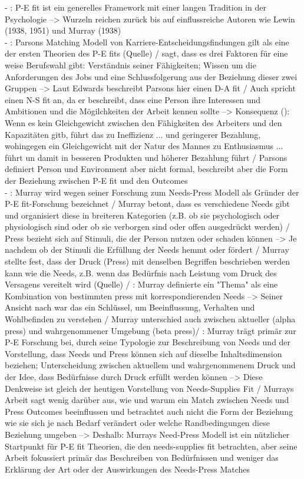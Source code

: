 - \cite[S. 1]{edwards:1990}: P-E fit ist ein generelles Framework mit einer langen Tradition in der Psychologie --> Wurzeln reichen zurück bis auf einflussreiche Autoren wie Lewin (1938, 1951) und Murray (1938) \\
- \cite[S. 6f.]{edwards:2008}: Parsons Matching Modell von Karriere-Entscheidungsfindungen gilt als eine der ersten Theorien des P-E fits (Quelle) / \textcite[S. 5]{parsons:1909} sagt, dass es drei Faktoren für eine weise Berufswahl gibt: Verständnis seiner Fähigkeiten; Wissen um die Anforderungen des Jobs und eine Schlussfolgerung aus der Beziehung dieser zwei Gruppen --> Laut Edwards beschreibt Parsons hier einen D-A fit / Auch spricht \textcite{parsons:1909} einen N-S fit an, da er beschreibt, dass eine Person ihre Interessen und Ambitionen und die Mögilchkeiten der Arbeit kennen sollte --> Konsequenz (\cite[S. 3]{parsons:1909}): Wenn es kein Gleichgewicht zwischen den Fähigkeiten des Arbeiters und den Kapazitäten gitb, führt das zu Ineffizienz ... und geringerer Bezahlung, wohingegen ein Gleichgewicht mit der Natur des Mannes zu Enthusiasmus ... führt un damit in besseren Produkten und höherer Bezahlung führt / Parsons definiert Person und Environment aber nicht formal, beschreibt aber die Form der Beziehung zwischen P-E fit und den Outcomes \\
- \cite[S. 7]{edwards:2008}: Murray wird wegen seiner Forschung zum Needs-Press Modell als Gründer der P-E fit-Forschung bezeichnet / Murray betont, dass es verschiedene Needs gibt und organisiert diese in breiteren Kategorien (z.B. ob sie psychologisch oder physiologisch sind oder ob sie verborgen sind oder offen ausgedrückt werden) / Press bezieht sich auf Stimuli, die der Person nutzen oder schaden können --> Je nachdem ob der Stimuli die Erfüllung der Needs hemmt oder fördert / Murray stellte fest, dass der Druck (Press) mit denselben Begriffen beschrieben werden kann wie die Needs, z.B. wenn das Bedürfnis nach Leistung vom Druck des Versagens vereitelt wird (Quelle) / \cite[S. 7f.]{edwards:2008}: Murray definierte ein "Thema" als eine Kombination von bestimmten press mit korrespondierenden Needs --> Seiner Ansicht nach war das ein Schlüssel, um Beeinflussung, Verhalten und Wohlbefinden zu verstehen / Murray unterschied auch zwischen aktueller (alpha press) und wahrgenommener Umgebung (beta press)/ \cite[S. 8]{edwards:2008}: Murray trägt primär zur P-E Forschung bei, durch seine Typologie zur Beschreibung von Needs und der Vorstellung, dass Needs und Press können sich auf dieselbe Inhaltsdimension beziehen; Unterscheidung zwischen aktuellem und wahrgenommenem Druck und der Idee, dass Bedürfnisse durch Druck erfüllt werden können --> Diese Denkweise ist gleich der heutigen Vorstellung von Needs-Supplies Fit / Murrays Arbeit sagt wenig darüber aus, wie und warum ein Match zwischen Needs und Press Outcomes beeinflussen und betrachtet auch nicht die Form der Beziehung wie sie sich je nach Bedarf verändert oder welche Randbedingungen diese Beziehung umgeben --> Deshalb: Murrays Need-Press Modell ist ein nützlicher Startpunkt für P-E fit Theorien, die den needs-supplies fit betrachten, aber seine Arbeit fokussiert primär das Beschreiben von Bedürfnissen und weniger das Erklärung der Art oder der Auswirkungen des Needs-Press Matches \\
